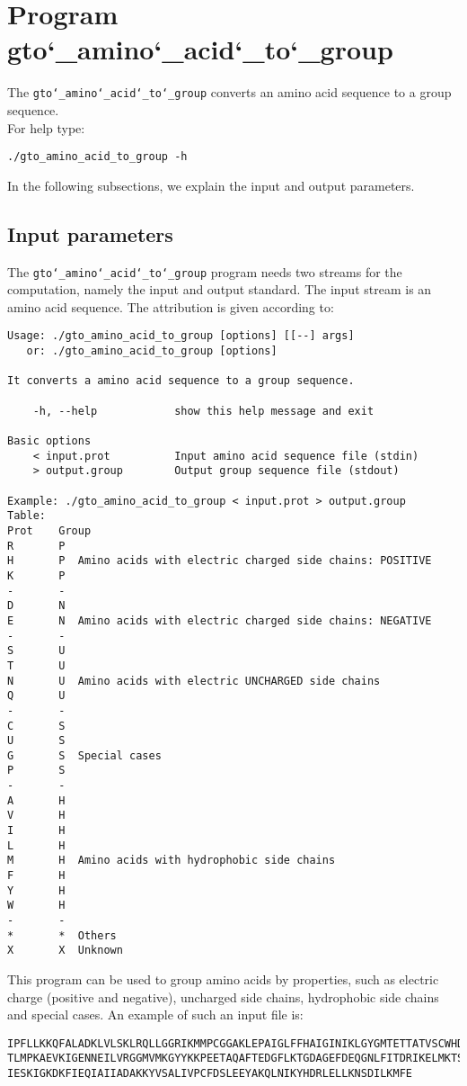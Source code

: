 \section{Program gto\char`_amino\char`_acid\char`_to\char`_group}

The \texttt{gto\char`_amino\char`_acid\char`_to\char`_group} converts an amino acid sequence to a group 
sequence.\\
For help type:
\begin{lstlisting}
./gto_amino_acid_to_group -h
\end{lstlisting}
In the following subsections, we explain the input and output parameters.

\subsection*{Input parameters}

The \texttt{gto\char`_amino\char`_acid\char`_to\char`_group} program needs two streams for the computation, namely the input and output standard. The input stream is an amino acid sequence.
The attribution is given according to:
\begin{lstlisting}
Usage: ./gto_amino_acid_to_group [options] [[--] args]
   or: ./gto_amino_acid_to_group [options]

It converts a amino acid sequence to a group sequence.

    -h, --help            show this help message and exit

Basic options
    < input.prot          Input amino acid sequence file (stdin)
    > output.group        Output group sequence file (stdout)

Example: ./gto_amino_acid_to_group < input.prot > output.group
Table:
Prot	Group
R		P
H		P  Amino acids with electric charged side chains: POSITIVE
K		P
-		-
D		N
E		N  Amino acids with electric charged side chains: NEGATIVE
-		-
S		U
T		U
N		U  Amino acids with electric UNCHARGED side chains
Q		U
-		-
C		S
U		S
G		S  Special cases
P		S
-		-
A		H
V		H
I		H
L		H
M		H  Amino acids with hydrophobic side chains
F		H
Y		H
W		H
-		-
*		*  Others
X		X  Unknown
\end{lstlisting}
This program can be used to group amino acids by properties, such as electric charge (positive
and negative), uncharged side chains, hydrophobic side chains and special cases.
An example of such an input file is:
\begin{lstlisting}
IPFLLKKQFALADKLVLSKLRQLLGGRIKMMPCGGAKLEPAIGLFFHAIGINIKLGYGMTETTATVSCWHDFQFNPNSIG
TLMPKAEVKIGENNEILVRGGMVMKGYYKKPEETAQAFTEDGFLKTGDAGEFDEQGNLFITDRIKELMKTSNGKYIAPQY
IESKIGKDKFIEQIAIIADAKKYVSALIVPCFDSLEEYAKQLNIKYHDRLELLKNSDILKMFE
\end{lstlisting}

